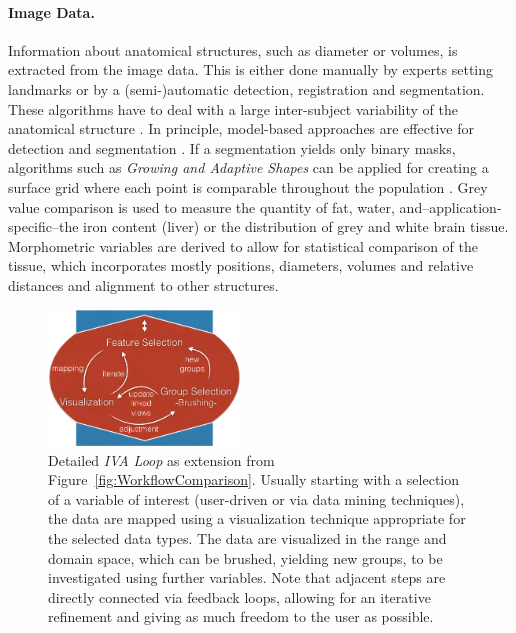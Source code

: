 \documentclass[journal]{style/vgtc} 			          %
\begin{document}
\paragraph{Image Data. }
Information about anatomical structures, such as diameter or volumes, is extracted from the image data.
%
This is either done manually by experts setting landmarks or by a (semi-)automatic detection, registration and segmentation.
%
These algorithms have to deal with a large inter-subject variability of the anatomical structure \cite{Preim2014}.
%
In principle, model-based approaches are effective for detection \cite{Rak2013} and segmentation \cite{Gloger2010}. %
%
If a segmentation yields only binary masks, algorithms such as \emph{Growing and Adaptive Shapes} can be applied for creating a surface grid where each point is comparable throughout the population \cite{Ferrarini2007}.
%
Grey value comparison is used to measure the quantity of fat, water, and--application-specific--the iron content (liver) or the distribution of grey and white brain tissue.
%
Morphometric variables are derived to allow for statistical comparison of the tissue, which incorporates mostly positions, diameters, volumes and relative distances and alignment to other structures.
\begin{figure}[htb]
 \centering
 \includegraphics[width=2.0in]{figures/InteractionLoop}
 \caption{Detailed \emph{IVA Loop} as extension from Figure~\ref{fig:WorkflowComparison}.
 Usually starting with a selection of a variable of interest (user-driven or via data mining techniques), the data are mapped using a visualization technique appropriate for the selected data types.
 The data are visualized in the range and domain space, which can be brushed, yielding new groups, to be investigated using further variables.
 Note that adjacent steps are directly connected via feedback loops, allowing for an iterative refinement and giving as much freedom to the user as possible.}
 \label{fig:InteractionLoop}
\end{figure}
\end{document}
